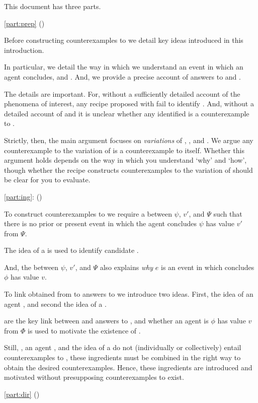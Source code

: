 \begin{note}
  This document has three parts.
  \begin{TOCEnum}
  \item
    \autoref{part:prep} ()

    Before constructing counterexamples to \issueInclusion{} we detail key ideas introduced in this introduction.

    In particular, we detail the way in which we understand an event in which an agent concludes, and .
    And, we provide a precise account of answers to \qWhy{} and \qHow{}.

    The details are important.
    For, without a sufficiently detailed account of the phenomena of interest, any recipe proposed with fail to identify .
    And, without a detailed account of \qWhy{} and \qHow{} it is unclear whether any identified  is a counterexample to \issueInclusion{}.

    Strictly, then, the main argument focuses on \emph{variations} of \qWhy{}, \qHow{}, and \issueInclusion{}.
    We argue any counterexample to the variation of \issueInclusion{} is a counterexample to \issueInclusion{} itself.
    Whether this argument holds depends on the way in which you understand `why' and `how', though whether the recipe constructs counterexamples to the variation of \issueInclusion{} should be clear for you to evaluate.
  \item
    \autoref{part:ing}: ()

    To construct counterexamples to \issueInclusion{} we require a \ros{} between \(\psi\), \(v'\), and \(\Psi\) such that there is no prior or present event in which the agent concludes \(\psi\) has value \(v'\) from \(\Psi\).

    The idea of a \fc{} is used to identify candidate \ros{}.

    And, the \ros{} between \(\psi\), \(v'\), and \(\Psi\) also explains \emph{why} \(e\) is an event in which \vAgent{} concludes \(\phi\) has value \(v\).

    To link  obtained from  to answers to \qWhy{} we introduce two ideas.
    First, the idea of an agent \tCV{}, and second the idea of a \requ{}.

     are the key link between \ros{} and answers to \qWhy{}, and whether an agent is \tCV{} \(\phi\) has value \(v\) from \(\Phi\) is used to motivate the existence of .

    Still, , an agent , and the idea of a \requ{} do not (individually or collectively) entail counterexamples to \issueInclusion{}, these ingredients must be combined in the right way to obtain the desired counterexamples.
    Hence, these ingredients are introduced and motivated without presupposing counterexamples to \issueInclusion{} exist.
  \item
    \autoref{part:dir} ()


\end{TOCEnum}
\end{note}
